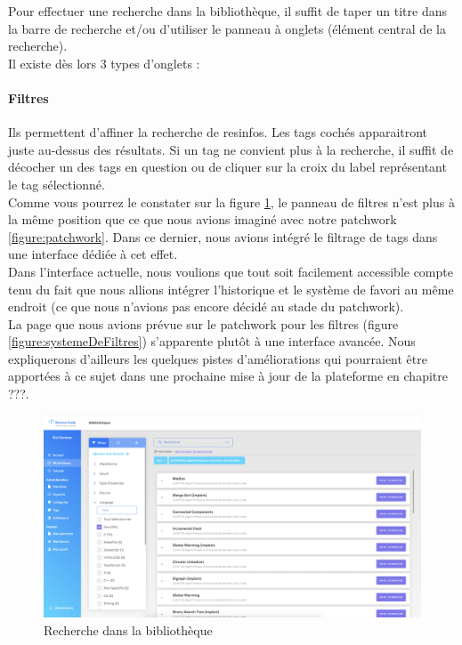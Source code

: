 \label{section:panneau}

Pour effectuer une recherche dans la bibliothèque, il suffit de taper un titre dans la barre de recherche et/ou d'utiliser le panneau à onglets (élément central de la recherche).\\

Il existe dès lors 3 types d'onglets :

\paragraph{Filtres} Ils permettent d'affiner la recherche de \glspl{resinfo}. Les \glspl{tag} cochés apparaitront juste au-dessus des résultats. Si un \gls{tag} ne convient plus à la recherche, il suffit de décocher un des tags en question ou de cliquer sur la croix du label représentant le \gls{tag} sélectionné.\\

Comme vous pourrez le constater sur la figure \ref{figure:rechercheBibliotheque}, le panneau de filtres n'est plus à la même position que ce que nous avions imaginé avec notre patchwork \ref{figure:patchwork}. Dans ce dernier, nous avions intégré le filtrage de \glspl{tag} dans une interface dédiée à cet effet.\\

Dans l'interface actuelle, nous voulions que tout soit facilement accessible compte tenu du fait que nous allions intégrer l'historique et le système de favori au même endroit (ce que nous n'avions pas encore décidé au stade du patchwork).\\

La page que nous avions prévue sur le patchwork pour les filtres (figure \ref{figure:systemeDeFiltres}) s'apparente plutôt à une interface avancée. Nous expliquerons d'ailleurs les quelques pistes d'améliorations qui pourraient être apportées à ce sujet dans une prochaine mise à jour de la plateforme en chapitre ???.

\begin{figure}[H]
    \includegraphics[width=\textwidth,height=\textheight,keepaspectratio]{images/client/search-library.png}
    \centering
    \caption[SourceCode : recherche dans la bibliothèque]{Recherche dans la bibliothèque}
    \label{figure:rechercheBibliotheque}
\end{figure}

